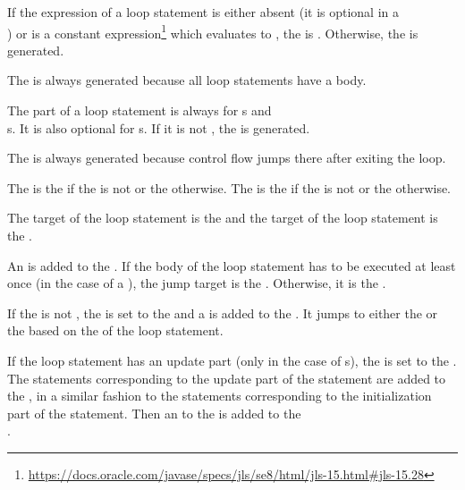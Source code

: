If the  expression of a loop statement is either absent (it is optional in a\\
) or is a constant expression\footnote{\url{https://docs.oracle.com/javase/specs/jls/se8/html/jls-15.html#jls-15.28}}
which evaluates to , the  is . Otherwise, the  is
generated.

The  is always generated because all loop statements have a body.

The  part of a loop statement is always  for s and\\
s. It is also optional for s. If it is not , the
 is generated.

The  is always generated because control flow jumps there after exiting the loop.

The  is the  if the  is not  or the
 otherwise. The  is the  if the  is not
 or the  otherwise.

The  target of the loop statement is the  and the  target of the loop
statement is the .

An  is added to the . If the body of the loop statement has to be
executed at least once (in the case of a ), the jump target is the . Otherwise,
it is the .

If the  is not , the  is set to the  and a
 is added to the . It jumps to either the  or the
 based on the  of the loop statement.

If the loop statement has an update part (only in the case of s), the  is set
to the . The statements corresponding to the update part of the  statement are added to the
, in a similar fashion to the statements corresponding to the initialization part of the 
statement. Then an  to the  is added to the\\
.

